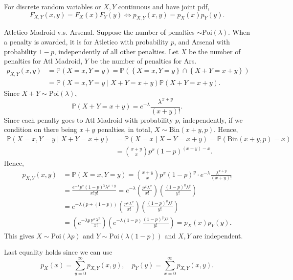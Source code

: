 \begin{remark}
    For discrete random variables or \(X, Y\) continuous and have joint pdf,
    \[
        F_{X, Y}(x, y) = F_X(x) F_Y(y) \iff p_{X, Y} (x, y) = p_X(x) p_Y(y).
    \]
\end{remark}

\begin{eg}
    Atletico Madroid v.s. Arsenal. Suppose the number of penalties \(\sim \mathrm{Poi}(\lambda) \). When a penalty is awarded, it is for Atletico with probability \(p\), and Arsenal with probability \(1 - p\), independently of all other penalties. Let \(X\) be the number of penalties for Atl Madroid, \(Y\) be the number of penalties for Ars. 
    \begin{align*}
        p_{X, Y}(x, y) &= \mathbb{P} (X = x, Y = y) = \mathbb{P} (\left\{ X = x, Y = y \right\} \cap \left\{ X + Y = x + y \right\}) \\
        &= \mathbb{P} (X = x, Y = y \mid X + Y = x + y) \mathbb{P} (X + Y = x + y).
    \end{align*}
    Since \(X + Y \sim \mathrm{Poi}(\lambda)\), 
    \[
        \mathbb{P} (X + Y = x + y) = e^{-\lambda} \frac{\lambda ^{x + y}}{(x + y)!}.
    \] 
    Since each penalty goes to Atl Madroid with probability \(p\), independently, if we condition on there being \(x+y\) penalties, in total, \(X \sim \mathrm{Bin}(x+y, p) \). Hence,
    \begin{align*}
        \mathbb{P} (X = x, Y = y \mid X + Y = x + y) &= \mathbb{P} (X = x \mid X + Y = x + y) = \mathbb{P} (\mathrm{Bin}(x+y, p) = x)\\ 
        &= \binom{x+y}{x} p^x (1-p)^{(x+y)-x}.
    \end{align*}   
    Hence,
    \begin{align*}
        p_{X, Y}(x, y) &= \mathbb{P} (X = x, Y = y) = \binom{x+y}{x} p^x (1-p)^y \cdot e^{-\lambda } \frac{\lambda ^{x+y}}{(x+y)!} \\
        &= \frac{e^{-\lambda} p^x (1-p)^y \lambda ^{x+y}}{x! y!} = e^{-\lambda } \left( \frac{p^x \lambda ^x}{x!} \right) \left( \frac{(1-p)^y \lambda ^y}{y!} \right) \\
        &= e^{-\lambda (p + (1 - p))} \left( \frac{p^x \lambda ^x}{x!} \right) \left( \frac{(1-p)^y \lambda ^y}{y!} \right) \\
        &= \left( e^{-\lambda p} \frac{p^x \lambda ^x}{x!} \right) \left( e^{-\lambda (1 - p)} \frac{(1-p)^y \lambda ^y}{y!} \right) = p_X(x) p_Y(y).
    \end{align*}
    This gives \(X \sim \mathrm{Poi}(\lambda p) \) and \(Y \sim \mathrm{Poi}(\lambda (1 - p)) \) and \(X, Y\) are independent.

    \begin{remark}
        Last equality holds since we can use 
        \[
            p_X(x) = \sum_{y=0}^{\infty} p_{X, Y}(x, y), \quad p_Y(y) = \sum_{x = 0}^{\infty} p_{X, Y}(x, y).  
        \]
    \end{remark}  
\end{eg}

